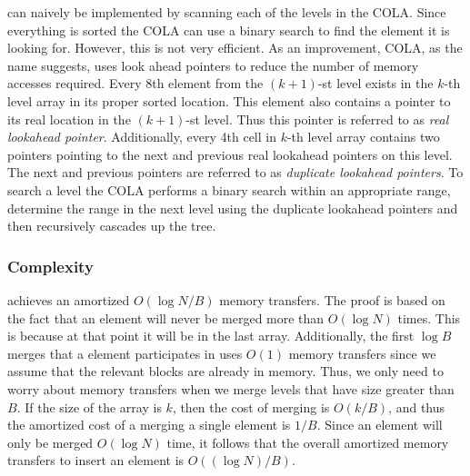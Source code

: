 \documentclass[preprint]{style}
\begin{document}
\Search{} can naively be implemented by scanning each of the levels in the
COLA. Since everything is sorted the COLA can use a binary search to find the
element it is looking for. However, this is not very efficient. As an
improvement, COLA, as the name suggests, uses look ahead pointers to reduce the
number of memory accesses required. Every 8th element from the $(k+1)$-st level
exists in the $k$-th level array in its proper sorted location. This element
also contains a pointer to its real location in the $(k+1)$-st level. Thus this
pointer is referred to as \textit{real lookahead pointer}. Additionally, every
4th cell in $k$-th level array contains two pointers pointing to the next and
previous real lookahead pointers on this level. The next and previous pointers
are referred to as \textit{duplicate lookahead pointers}. To search a level the
COLA performs a binary search within an appropriate range, determine the range
in the next level using the duplicate lookahead pointers and then recursively
cascades up the tree.

\subsubsection{Complexity}

\Insert{} achieves an amortized $O(\log N / B)$ memory transfers. The proof is
based on the fact that an element will never be merged more than $O(\log{N})$
times. This is because at that point it will be in the last array.
Additionally, the first $\log{B}$ merges that a element participates in uses
$O(1)$ memory transfers since we assume that the relevant blocks are already in
memory. Thus, we only need to worry about memory transfers when we merge levels
that have size greater than $B$. If the size of the array is $k$, then the cost
of merging is $O(k/B)$, and thus the amortized cost of a merging a single
element is $1/B$. Since an element will only be merged $O(\log{N})$ time, it
follows that the overall amortized memory transfers to insert an element is
$O((\log N)/B)$.
\end{document}
